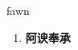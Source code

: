 
\begin{frame}
{\huge fawn}
\begin{center}
\begin{enumerate}\Large
  \item \textbf{阿谀奉承}
\end{enumerate}
\end{center}
\end{frame}
